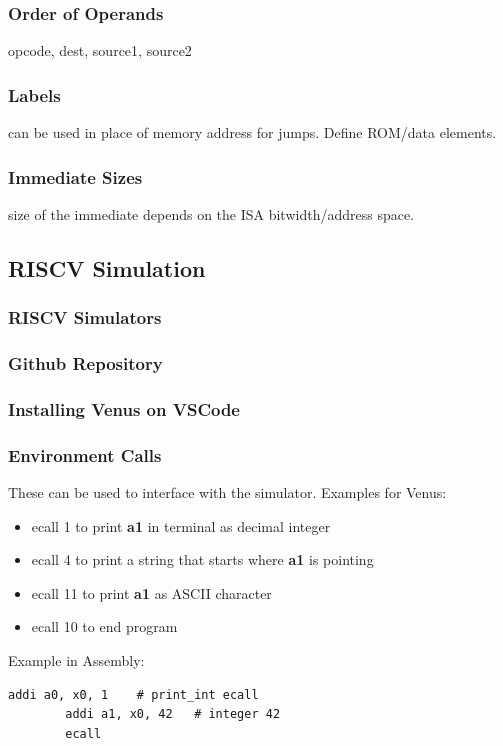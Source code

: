 \documentclass[10pt,a4paper]{article}
\begin{document}
      \subsubsection{Order of Operands}
        opcode, dest, source1, source2
      \subsubsection{Labels}
        can be used in place of memory address for jumps. Define ROM/data elements.
      \subsubsection{Immediate Sizes}
        size of the immediate depends on the ISA bitwidth/address space.
    \subsection{RISCV Simulation}
      \subsubsection{RISCV Simulators}
      \subsubsection{Github Repository}
      \subsubsection{Installing Venus on VSCode}
      \subsubsection{Environment Calls}
        These can be used to interface with the simulator. Examples for Venus:
        \begin{itemize}
          \item ecall 1 to print \textbf{a1} in terminal as decimal integer
          \item ecall 4 to print a string that starts where \textbf{a1} is pointing
          \item ecall 11 to print \textbf{a1} as ASCII character
          \item ecall 10 to end program
        \end{itemize}
        Example in Assembly:
        \begin{lstlisting}[language=RISCV]
        addi a0, x0, 1    # print_int ecall
        addi a1, x0, 42   # integer 42
        ecall
        \end{lstlisting}
\end{document}
